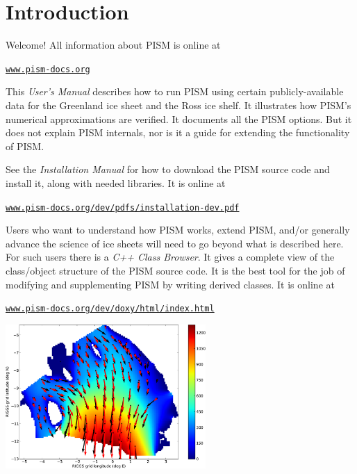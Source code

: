 \documentclass[titlepage,letterpaper,final]{scrartcl}
\renewcommand{\t}[1]{\texttt{#1}}
\begin{document}
\newpage
\setcounter{tocdepth}{3}
\small
\tableofcontents
\normalsize

\newpage


\section{Introduction}\label{sect:intro}

Welcome!  All information about PISM is online at
\begin{center}
  \href{http://www.pism-docs.org}{\t{www.pism-docs.org}}
\end{center}

This \emph{User's Manual} describes how to run PISM using certain publicly-available data for the Greenland ice sheet and the Ross ice shelf.  It illustrates how PISM's numerical approximations are verified.  It documents all the PISM options.  But it does not explain PISM internals, nor is it a guide for extending the functionality of PISM.

See the \emph{Installation Manual} for how to download the PISM source code and install it, along with needed libraries.  It is online at
   \begin{center}
     \href{http://www.pism-docs.org/dev/pdfs/installation-dev.pdf}{\t{www.pism-docs.org/dev/pdfs/installation-dev.pdf}}
   \end{center}

Users who want to understand how PISM works, extend PISM, and/or generally advance the science of ice sheets will need to go beyond what is described here.  For such users there is a \emph{C++ Class Browser}.  It gives a complete view of the class/object structure of the PISM source code.  It is the best tool for the job of modifying and supplementing PISM by writing derived classes.  It is online at
   \begin{center}
     \href{http://www.pism-docs.org/dev/doxy/html/index.html}{\t{www.pism-docs.org/dev/doxy/html/index.html}}
   \end{center}

\vspace{.5in}
  
\begin{center}
\includegraphics[width=3in,keepaspectratio=true]{rossquiver}
\end{center}
\end{document}
